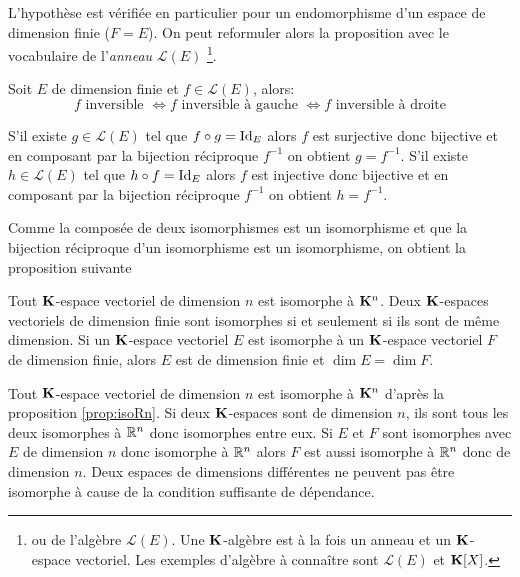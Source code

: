 \begin{rem}
 L'hypothèse est vérifiée en particulier pour un endomorphisme d'un espace de dimension finie ($F = E$). On peut reformuler alors la proposition avec le vocabulaire de l'\emph{anneau} $\mathcal{L}(E)$ \footnote{ou de l'algèbre $\mathcal{L}(E)$. Une $\mathbf{K}$-algèbre est à la fois un anneau et un $\mathbf{K}$-espace vectoriel. Les exemples d'algèbre à connaître sont $\mathcal{L}(E)$ et $\mathbf{K}[X]$.}. 
\end{rem}
\begin{propn}
  Soit $E$ de dimension finie et $f\in \mathcal{L}(E)$, alors:
\begin{displaymath}
  f \text{ inversible } \Leftrightarrow f \text{ inversible à gauche } \Leftrightarrow f \text{ inversible à droite}
\end{displaymath}
\end{propn}
\begin{demo}
S'il existe $g\in \mathcal{L}(E)$ tel que $f\circ g = \mathop{\mathrm{Id}}_E$ alors $f$ est surjective donc bijective et en composant par la bijection réciproque $f^{-1}$ on obtient $g=f^{-1}$.\newline
S'il existe $h\in \mathcal{L}(E)$ tel que $h\circ f = \mathop{\mathrm{Id}}_E$ alors $f$ est injective donc bijective et en composant par la bijection réciproque $f^{-1}$ on obtient $h=f^{-1}$.
\end{demo}

Comme la composée de deux isomorphismes est un isomorphisme et que la bijection réciproque d'un isomorphisme est un isomorphisme, on obtient la proposition suivante
\begin{propn}
 Tout $\mathbf{K}$-espace vectoriel de dimension $n$ est isomorphe à $\mathbf{K}^n$.\newline
 Deux $\mathbf{K}$-espaces vectoriels de dimension finie sont isomorphes si et seulement si ils sont de même dimension.\newline
 Si un $\mathbf{K}$-espace vectoriel $E$ est isomorphe à un $\mathbf{K}$-espace vectoriel $F$ de dimension finie, alors $E$ est de dimension finie et $\dim E = \dim F$.
\end{propn}
\begin{demo}
  Tout $\mathbf{K}$-espace vectoriel de dimension $n$ est isomorphe à $\mathbf{K}^n$ d'après la proposition \ref{prop:isoRn}.\newline
  Si deux $\mathbf{K}$-espaces sont de dimension $n$, ils sont tous les deux isomorphes à $\mathbb{R}^n$ donc isomorphes entre eux.\newline
  Si $E$ et $F$ sont isomorphes avec $E$ de dimension $n$ donc isomorphe à $\mathbb{R}^n$ alors $F$ est aussi isomorphe à $\mathbb{R}^n$ donc de dimension $n$.\newline
  Deux espaces de dimensions différentes ne peuvent pas être isomorphe à cause de la condition suffisante de dépendance.
\end{demo}

